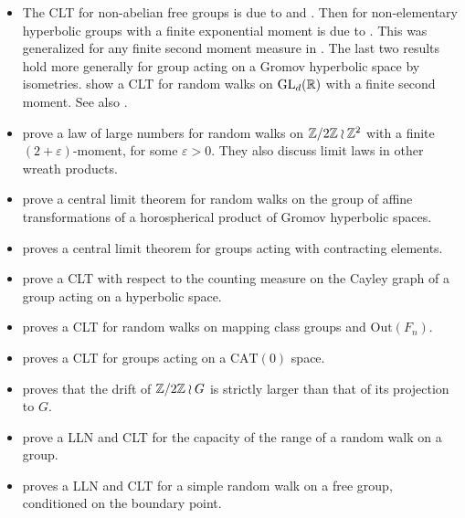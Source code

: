 \begin{itemize}
	\item The CLT for non-abelian free groups is due to \cite{SawyerSteger1987} and \cite{Ledrappier2001}. Then for non-elementary hyperbolic groups with a finite exponential moment is due to \cite{Bjorklund2010}. This was generalized for any finite second moment measure in \cite{BenoistQuint2016hyperbolic}. The last two results hold more generally for group acting on a Gromov hyperbolic space by isometries. \cite{BenoistQuint2016} show a CLT for random walks on $\mathrm{GL}_d(\mathbb{R})$ with a finite second moment. See also \cite{Gouezel2017}.
	\item \cite{ErschlerZheng2022} prove a law of large numbers for random walks on $\mathbb{Z}/2\mathbb{Z}\wr \mathbb{Z}^2$ with a finite $(2+\varepsilon)$-moment, for some $\varepsilon>0$. They also discuss limit laws in other wreath products.
	\item \cite{BahmanianForghaniGekhtmanMallahiKarai2024} prove a central limit theorem for random walks on the group of affine transformations of a horospherical product of Gromov hyperbolic spaces.
	\item \cite{Choi2023} proves a central limit theorem for groups acting with contracting elements.
	\item \cite{GekhtmanTaylorTiozzo2022} prove a CLT with respect to the counting measure on the Cayley graph of a group acting on a hyperbolic space.
	\item \cite{Horbez2018} proves a CLT for random walks on mapping class groups and $\mathrm{Out}(F_n).$
	\item \cite{LeBars2022} proves a CLT for groups acting on a $\mathrm{CAT}(0)$ space.
	\item  \cite{Gilch2008} proves that the drift of $\mathbb{Z}/2\mathbb{Z}\wr G$ is strictly larger than that of its projection to $G$.
	\item \cite{MrazovicSandriSebek2023} prove a LLN and CLT for the capacity of the range of a random walk on a group.
	\item \cite{Salaun2001} proves a LLN and CLT for a simple random walk on a free group, conditioned on the boundary point.
\end{itemize}